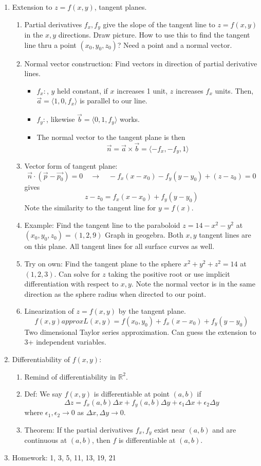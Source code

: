 \documentclass{article}
\begin{document}
\begin{enumerate}
\item Extension to $z=f(x,y)$, tangent planes.
\begin{enumerate}
\item Partial derivatives $f_x, f_y$ give the slope of the tangent line to $z=f(x,y)$ in the $x, y$ directions. Draw picture. How to use this to find the tangent line thru a point $(x_0, y_0, z_0)$? Need a point and a normal vector. 
\item Normal vector construction: Find vectors in direction of partial derivative lines.
\begin{itemize}
\item $f_x:$, $y$ held constant, if $x$ increases 1 unit, $z$ increases $f_x$ units. Then, $\vec{a}=\langle 1,0,f_x \rangle$ is parallel to our line.
\item $f_y:$, likewise $\vec{b}=\langle 0,1,f_y \rangle$ works.
\item The normal vector to the tangent plane is then
\[
\vec{n} = \vec{a} \times \vec{b} = \langle -f_x, -f_y, 1\rangle
\]
\end{itemize}
\item Vector form of tangent plane:
\[
\vec{n} \cdot (\vec{p}-\vec{p_0}) = 0 \quad \rightarrow \quad -f_x(x-x_0)-f_y(y-y_0)+(z-z_0)=0
\]
gives
\[
z-z_0=f_x(x-x_0)+f_y(y-y_0)
\]
Note the similarity to the tangent line for $y=f(x)$.
\item Example: Find the tangent line to the paraboloid $z=14-x^2-y^2$ at $(x_0,y_0,z_0)=(1,2,9)$ Graph in geogebra. Both $x,y$ tangent lines are on this plane. All tangent lines for all surface curves as well.
\item Try on own: Find the tangent plane to the sphere $x^2+y^2+z^2=14$ at $(1,2,3)$. Can solve for $z$ taking the positive root or use implicit differentiation with respect to $x,y$. Note the normal vector is in the same direction as the sphere radius when directed to our point.
\item Linearization of $z=f(x,y)$ by the tangent plane.
\[
f(x,y) approx L(x,y) = f(x_0, y_0)+f_x(x-x_0)+f_y(y-y_0)
\]
Two dimensional Taylor series approximation. Can guess the extension to 3+ independent variables.
\end{enumerate}

\item Differentiability of $f(x,y)$:
\begin{enumerate}
\item Remind of differentiability in $\mathbb{R}^2$. 
\item Def: We say $f(x,y)$ is differentiable at point $(a,b)$ if 
\[
\Delta z = f_x(a,b)\Delta x + f_y(a,b) \Delta y +\epsilon_1 \Delta x + \epsilon_2 \Delta y
\]
where $\epsilon_1,\epsilon_2 \rightarrow 0$ as $\Delta x,\Delta y \rightarrow 0$.
\item Theorem: If the partial derivatives $f_x,f_y$ exist near $(a,b)$ and are continuous at $(a,b)$, then $f$ is differentiable at $(a,b)$.
\end{enumerate}

\item Homework: 1, 3, 5, 11, 13, 19, 21

\end{enumerate}
\end{document}
